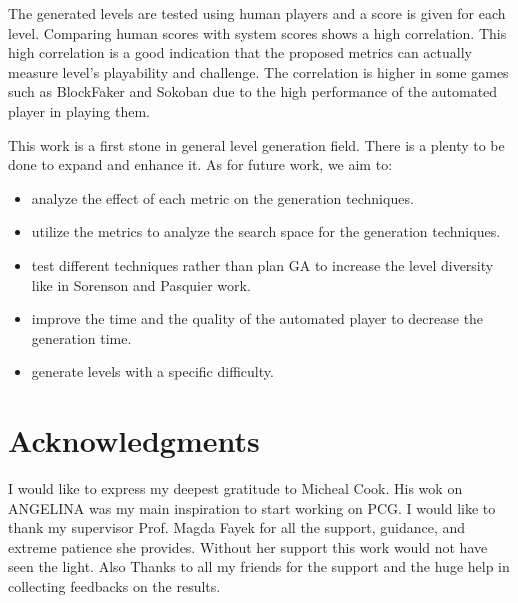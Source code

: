 \documentclass[letterpaper]{article}
\begin{document}
The generated levels are tested using human players and a score is given for each level. Comparing human scores with system scores shows a high correlation. This high correlation is a good indication that the proposed metrics can actually measure level's playability and challenge. The correlation is higher in some games such as BlockFaker and Sokoban due to the high performance of the automated player in playing them.\\\par

This work is a first stone in general level generation field. There is a plenty to be done to expand and enhance it. As for future work, we aim to:
\begin{itemize}
	\item analyze the effect of each metric on the generation techniques.
	\item utilize the metrics to analyze the search space for the generation techniques.
	\item test different techniques rather than plan GA to increase the level diversity like in Sorenson and Pasquier work\cite{genericLevelFramework}.
	\item improve the time and the quality of the automated player to decrease the generation time.
	\item generate levels with a specific difficulty.
\end{itemize}

\section{Acknowledgments}
I would like to express my deepest gratitude to Micheal Cook. His wok on ANGELINA was my main inspiration to start working on PCG. I would like to thank my supervisor Prof. Magda Fayek for all the support, guidance, and extreme patience she provides. Without her support this work would not have seen the light. Also Thanks to all my friends for the support and the huge help in collecting feedbacks on the results.



\end{document}
